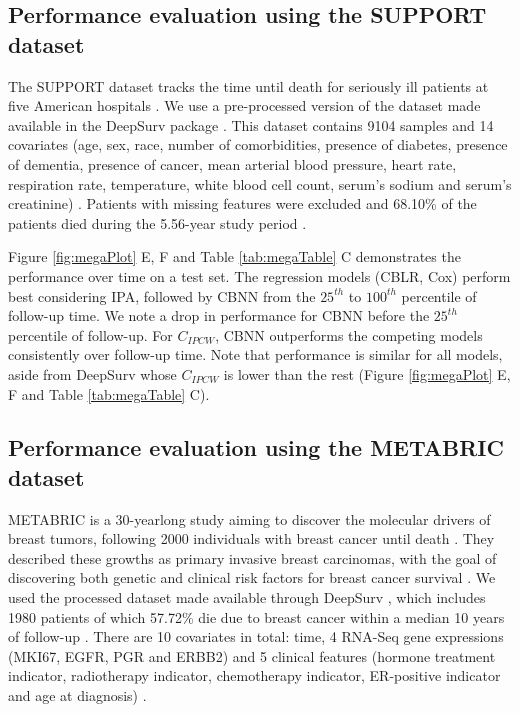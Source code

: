 \documentclass[APA,LATO1COL]{WileyNJD-v2}
\begin{document}
\hypertarget{performance-evaluation-using-the-support-dataset}{%
\subsection{Performance evaluation using the SUPPORT
dataset}\label{performance-evaluation-using-the-support-dataset}}

The SUPPORT dataset tracks the time until death for seriously ill
patients at five American hospitals \citep{knaus1995SUPPORT}. We use a
pre-processed version of the dataset made available in the DeepSurv
package \citep{katzman2018DeepSurv}. This dataset contains 9104 samples
and 14 covariates (age, sex, race, number of comorbidities, presence of
diabetes, presence of dementia, presence of cancer, mean arterial blood
pressure, heart rate, respiration rate, temperature, white blood cell
count, serum's sodium and serum's creatinine)
\citep{katzman2018DeepSurv}. Patients with missing features were
excluded and 68.10\% of the patients died during the 5.56-year study
period \citep{katzman2018DeepSurv}.

Figure \ref{fig:megaPlot} E, F and Table \ref{tab:megaTable} C
demonstrates the performance over time on a test set. The regression
models (CBLR, Cox) perform best considering IPA, followed by CBNN from
the \(25^{th}\) to \(100^{th}\) percentile of follow-up time. We note a
drop in performance for CBNN before the \(25^{th}\) percentile of
follow-up. For \(C_{IPCW}\), CBNN outperforms the competing models
consistently over follow-up time. Note that performance is similar for
all models, aside from DeepSurv whose \(C_{IPCW}\) is lower than the
rest (Figure \ref{fig:megaPlot} E, F and Table \ref{tab:megaTable} C).

\hypertarget{performance-evaluation-using-the-metabric-dataset}{%
\subsection{Performance evaluation using the METABRIC
dataset}\label{performance-evaluation-using-the-metabric-dataset}}

METABRIC is a 30-yearlong study aiming to discover the molecular drivers
of breast tumors, following 2000 individuals with breast cancer until
death \citep{curtis2012genomic}. They described these growths as primary
invasive breast carcinomas, with the goal of discovering both genetic
and clinical risk factors for breast cancer survival
\citep{curtis2012genomic}. We used the processed dataset made available
through DeepSurv \citep{katzman2018DeepSurv}, which includes 1980
patients of which 57.72\% die due to breast cancer within a median 10
years of follow-up \citep{katzman2018DeepSurv}. There are 10 covariates
in total: time, 4 RNA-Seq gene expressions (MKI67, EGFR, PGR and ERBB2)
and 5 clinical features (hormone treatment indicator, radiotherapy
indicator, chemotherapy indicator, ER-positive indicator and age at
diagnosis) \citep{katzman2018DeepSurv}.
\end{document}
